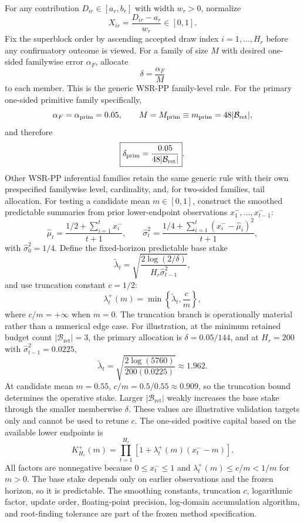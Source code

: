 \documentclass[11pt,a4paper]{article}
\newcommand{\Bret}{\mathcal B_{\mathrm{ret}}}
\begin{document}
For any contribution $D_{ir}\in[a_r,b_r]$ with width $w_r>0$, normalize
\[
X_{ir}=\frac{D_{ir}-a_r}{w_r}\in[0,1].
\]
Fix the superblock order by ascending accepted draw index $i=1,\ldots,H_r$ before any confirmatory outcome is viewed. For a family of size $M$ with desired one-sided familywise error $\alpha_F$, allocate
\[
\delta=\frac{\alpha_F}{M}
\]
to each member. This is the generic WSR-PP family-level rule. For the primary one-sided primitive family specifically,
\[
\alpha_F=\alpha_{\rm prim}=0.05,
\qquad
M=M_{\rm prim}\equiv m_{\rm prim}=48|\Bret|,
\]
and therefore
\[
\boxed{\delta_{\rm prim}=\frac{0.05}{48|\Bret|}}.
\]
Other WSR-PP inferential families retain the same generic rule with their own prespecified familywise level, cardinality, and, for two-sided families, tail allocation. For testing a candidate mean $m\in[0,1]$, construct the smoothed predictable summaries from prior lower-endpoint observations $x_1^-,\ldots,x_{t-1}^-$:
\[
\widehat\mu_t=\frac{1/2+\sum_{i=1}^{t}x_i^-}{t+1},
\qquad
\widehat\sigma_t^2=\frac{1/4+\sum_{i=1}^{t}(x_i^- - \widehat\mu_i)^2}{t+1},
\]
with $\widehat\sigma_0^2=1/4$. Define the fixed-horizon predictable base stake
\[
\widetilde\lambda_t
=\sqrt{\frac{2\log(2/\delta)}{H_r\widehat\sigma_{t-1}^2}},
\]
and use truncation constant $c=1/2$:
\[
\lambda_t^+(m)=\min\!\left\{\widetilde\lambda_t,\frac{c}{m}\right\},
\]
where $c/m=+\infty$ when $m=0$. The truncation branch is operationally material rather than a numerical edge case. For illustration, at the minimum retained budget count $|\Bret|=3$, the primary allocation is $\delta=0.05/144$, and at $H_r=200$ with $\widehat\sigma_{t-1}^2=0.0225$,
\[
\widetilde\lambda_t
=
\sqrt{\frac{2\log(5760)}{200(0.0225)}}
\approx1.962.
\]
At candidate mean $m=0.55$, $c/m=0.5/0.55\approx0.909$, so the truncation bound determines the operative stake. Larger $|\Bret|$ weakly increases the base stake through the smaller memberwise $\delta$. These values are illustrative validation targets only and cannot be used to retune $c$. The one-sided positive capital based on the available lower endpoints is
\[
K_{H_r}^+(m)=\prod_{t=1}^{H_r}\left[1+\lambda_t^+(m)(x_t^- - m)\right].
\]
All factors are nonnegative because $0\le x_t^-\le1$ and $\lambda_t^+(m)\le c/m<1/m$ for $m>0$. The base stake depends only on earlier observations and the frozen horizon, so it is predictable. The smoothing constants, truncation $c$, logarithmic factor, update order, floating-point precision, log-domain accumulation algorithm, and root-finding tolerance are part of the frozen method specification.
\end{document}
